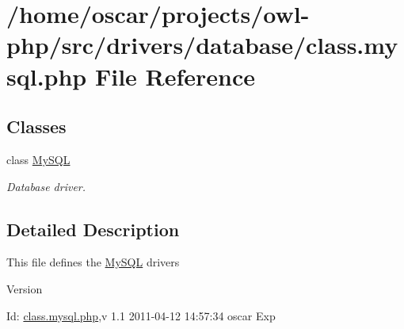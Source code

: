 \section{/home/oscar/projects/owl-\/php/src/drivers/database/class.mysql.php File Reference}
\label{class_8mysql_8php}
\subsection*{Classes}
\begin{DoxyCompactItemize}
\item 
class \hyperlink{classMySQL}{MySQL}
\begin{DoxyCompactList}\small\item\em Database driver. \item\end{DoxyCompactList}\end{DoxyCompactItemize}


\subsection{Detailed Description}
This file defines the \hyperlink{classMySQL}{MySQL} drivers \begin{DoxyVersion}{Version}

\end{DoxyVersion}
\begin{DoxyParagraph}{Id:}
\hyperlink{class_8mysql_8php}{class.mysql.php},v 1.1 2011-\/04-\/12 14:57:34 oscar Exp 
\end{DoxyParagraph}
